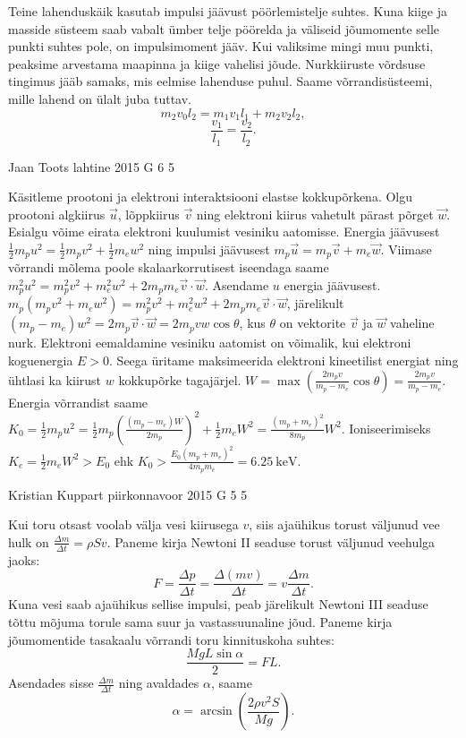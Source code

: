 \documentclass[11pt, twoside]{article}
\begin{document}
{{Teine lahenduskäik kasutab impulsi jäävust pöörlemistelje suhtes. Kuna kiige ja masside süsteem saab vabalt ümber telje pöörelda ja väliseid jõumomente selle punkti suhtes pole, on impulsimoment jääv. Kui valiksime mingi muu punkti, peaksime arvestama maapinna ja kiige vahelisi jõude. Nurkkiiruste võrdsuse tingimus jääb samaks, mis eelmise lahenduse puhul. Saame võrrandisüsteemi, mille lahend on ülalt juba tuttav.
\[
 m_2v_0l_2=m_1v_1l_1+m_2v_2l_2,
\]
\[
\frac{v_1}{l_1}=\frac{v_2}{l_2}.
\]
\fi
}

{Jaan Toots} %
{lahtine} %
{2015} %
{G 6} %
{5} %
{

\ifSolution
Käsitleme prootoni ja elektroni interaktsiooni elastse kokkupõrkena. Olgu prootoni algkiirus $\vec{u}$, lõppkiirus $\vec{v}$ ning elektroni kiirus vahetult pärast põrget $\vec{w}$. Esialgu võime eirata elektroni kuulumist vesiniku aatomisse. Energia jäävusest $\frac{1}{2}m_p u^2 = \frac{1}{2}m_p v^2 + \frac{1}{2}m_e w^2$ ning impulsi jäävusest $m_p \vec{u} = m_p \vec{v} + m_e \vec{w}$. Viimase võrrandi mõlema poole skalaarkorrutisest iseendaga saame $m_p^2 u^2 = m_p^2 v^2 + m_e^2 w^2 + 2 m_p m_e \vec{v}\cdot \vec{w}$. Asendame $u$ energia jäävusest. $m_p ( m_p v^2 + m_e w^2 ) = m_p^2 v^2 + m_e^2 w^2 + 2 m_p m_e \vec{v}\cdot \vec{w}$, järelikult $( m_p - m_e ) w^2 = 2 m_p \vec{v}\cdot\vec{w} = 2 m_p vw \cos\theta$, kus $\theta$ on vektorite $\vec{v}$ ja $\vec{w}$ vaheline nurk. Elektroni eemaldamine vesiniku aatomist on võimalik, kui elektroni koguenergia $E>0$. Seega üritame maksimeerida elektroni kineetilist energiat ning ühtlasi ka kiirust $w$ kokkupõrke tagajärjel.
$W = \max\left(\frac{2 m_p v}{m_p - m_e}\cos\theta\right) = \frac{2 m_p v}{m_p - m_e}$. Energia võrrandist saame $K_0 = \frac{1}{2}m_p u^2 = \frac{1}{2}m_p \left(\frac{( m_p - m_e ) W}{2 m_p}\right)^2 + \frac{1}{2}m_e W^2 = \frac{(m_p + m_e)^2}{8 m_p} W^2$. Ioniseerimiseks $K_e = \frac{1}{2}m_e W^2 > E_0$ ehk $K_0 > \frac{E_0 (m_p + m_e)^2}{4 m_p m_e} = \SI{6.25}{\kilo\electronvolt}$.
\fi
}

{Kristian Kuppart} %
{piirkonnavoor} %
{2015} %
{G 5} %
{5} %
{

\ifSolution
Kui toru otsast voolab välja vesi kiirusega $v$, siis ajaühikus torust väljunud vee hulk on $\frac{\Delta m}{\Delta t}=\rho S v$. Paneme kirja Newtoni II seaduse torust väljunud veehulga jaoks: 
\[ F=\frac{\Delta p}{\Delta t}=\frac{\Delta(mv)}{\Delta t}=v \frac{\Delta m}{\Delta t}. \]
Kuna vesi saab ajaühikus sellise impulsi, peab järelikult Newtoni III seaduse tõttu mõjuma torule sama suur ja vastassuunaline jõud. Paneme kirja jõumomentide tasakaalu võrrandi toru kinnituskoha suhtes: 
\[ \frac{MgL\sin \alpha}{2}=FL. \]
Asendades sisse $\frac{\Delta m}{\Delta t}$ ning avaldades $\alpha$, saame
\[ \alpha=\arcsin (\frac{2\rho v^2 S}{Mg}). \]
\fi
}

}
\end{document}
